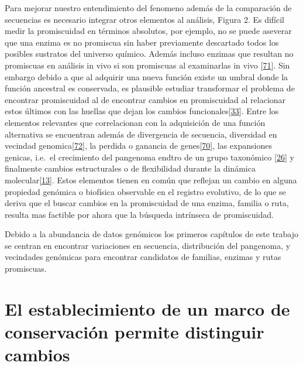 \documentclass[12pt,twoside]{reedthesis}
\begin{document}
  Para mejorar nuestro entendimiento del fenomeno además de la comparación
  de secuencias es necesario integrar otros elementos al análisis, Figura
  2. Es difícil medir la promiscuidad en términos absolutos, por ejemplo,
  no se puede aseverar que una enzima es no promiscua sin haber
  previamente descartado todos los posibles sustratos del universo
  químico. Además incluso enzimas que resultan no promiscuas en análisis
  in vivo si son promiscuas al examinarlas in vivo
  {[}\protect\hyperlink{ref-noda_tesis_2012}{71}{]}. Sin embargo debido a
  que al adquirir una nueva función existe un umbral donde la función
  ancestral es conservada, es plausible estudiar transformar el problema
  de encontrar promiscuidad al de encontrar cambios en promiscuidad al
  relacionar estos últimos con las huellas que dejan los cambios
  funcionales{[}\protect\hyperlink{ref-soskine_mutational_2010}{33}{]}.
  Entre los elementos relevantes que correlacionan con la adquisición de
  una función alternativa se encuentran además de divergencia de
  secuencia, diversidad en vecindad
  genomica{[}\protect\hyperlink{ref-zhao__function_prediction_neighbourhood_2014}{72}{]},
  la perdida o ganancia de
  genes{[}\protect\hyperlink{ref-juarez-vazquez_evolution_2017}{70}{]},
  las expansiones genicas, i.e.~el crecimiento del pangenoma endtro de un
  grupo taxonómico
  {[}\protect\hyperlink{ref-martinez-nunez_lifestyle_2015}{26}{]} y
  finalmente cambios estructurales o de flexibilidad durante la dinámica
  molecular{[}\protect\hyperlink{ref-zou_evolution_2015}{13}{]}. Estos
  elementos tienen en común que reflejan un cambio en alguna propiedad
  genómica o biofísica observable en el registro evolutivo, de lo que se
  deriva que el buscar cambios en la promiscuidad de una enzima, familia o
  ruta, resulta mas factible por ahora que la búsqueda intrínseca de
  promiscuidad.
  
  Debido a la abundancia de datos genómicos los primeros capítulos de este
  trabajo se centran en encontrar variaciones en secuencia, distribución
  del pangenoma, y vecindades genómicas para encontrar candidatos de
  familias, enzimas y rutas promiscuas.\\
  
  \section{El establecimiento de un marco de conservación permite
  distinguir
  cambios}\label{el-establecimiento-de-un-marco-de-conservacion-permite-distinguir-cambios}
  
\end{document}
